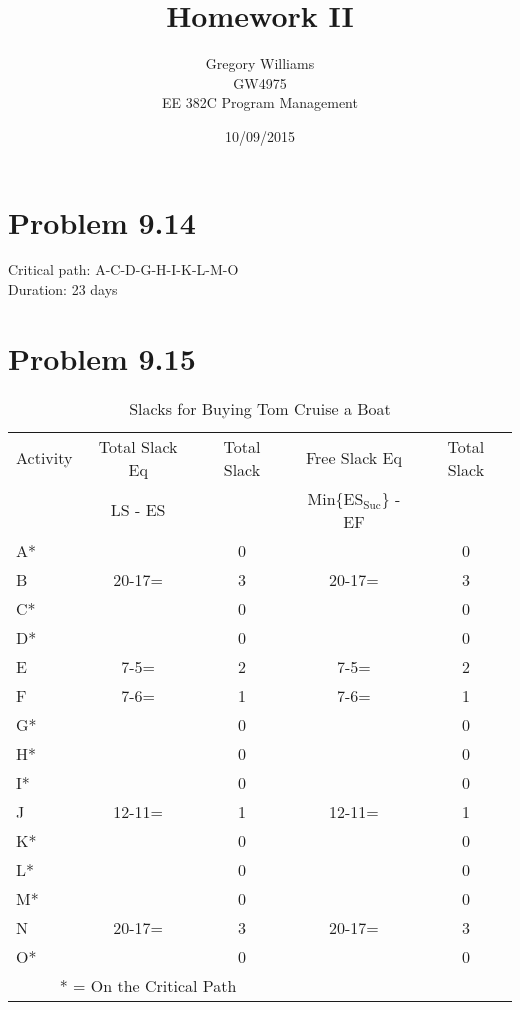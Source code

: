 \documentclass{article}
\title{Homework II}
\author{Gregory Williams\\GW4975\\EE 382C Program Management}
\date{10/09/2015}
\begin{document}
	\maketitle
	\section*{Problem 9.14}
	
	\begin{center}
	\makebox[\textwidth]{
		}
	\end{center}
	Critical path: A-C-D-G-H-I-K-L-M-O \\
	Duration: 23 days
	\pagebreak
	\section*{Problem 9.15}
	
	{\renewcommand{\arraystretch}{1.2} 
	\begin{table}[h!tbp]
  		\begin{center}
    		\caption{Slacks for Buying Tom Cruise a Boat}
    		\label{tab:table1}
			
    		\begin{tabular}{lcccc}
				Activity & Total Slack Eq & Total Slack & Free Slack Eq & Total Slack\\
				& LS - ES & & Min\{ES$_{\text{Suc}}$\} - EF & \\
				\hline
      			A* & & 0 & & 0\\
      			B & 20-17= & 3 & 20-17= & 3\\
				C* && 0 && 0\\
				D* && 0 && 0\\
				E & 7-5= & 2 & 7-5= & 2\\
				F & 7-6= & 1 & 7-6= & 1\\
				G* && 0 && 0\\
				H* && 0 && 0\\
				I* && 0 && 0\\
				J & 12-11= & 1 & 12-11= & 1\\
				K* && 0 && 0\\
				L* && 0 && 0\\
				M* && 0 && 0\\
				N & 20-17= & 3 & 20-17= & 3\\
				O* && 0 && 0\\
				\hline
				\multicolumn{3}{c}{* = On the Critical Path}\\
    		\end{tabular}
  		\end{center}
	\end{table}
	}
	
\end{document}
